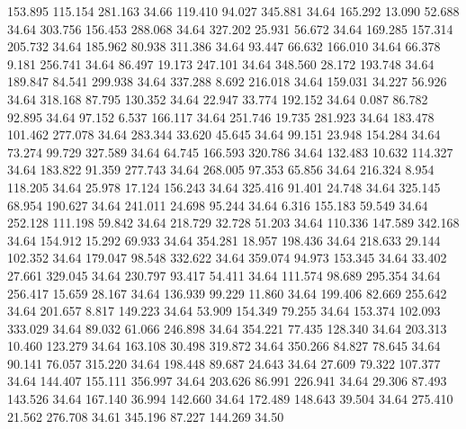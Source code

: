  153.895  115.154  281.163        34.66
 119.410   94.027  345.881        34.64
 165.292   13.090   52.688        34.64
 303.756  156.453  288.068        34.64
 327.202   25.931   56.672        34.64
 169.285  157.314  205.732        34.64
 185.962   80.938  311.386        34.64
  93.447   66.632  166.010        34.64
  66.378    9.181  256.741        34.64
  86.497   19.173  247.101        34.64
 348.560   28.172  193.748        34.64
 189.847   84.541  299.938        34.64
 337.288    8.692  216.018        34.64
 159.031   34.227   56.926        34.64
 318.168   87.795  130.352        34.64
  22.947   33.774  192.152        34.64
   0.087   86.782   92.895        34.64
  97.152    6.537  166.117        34.64
 251.746   19.735  281.923        34.64
 183.478  101.462  277.078        34.64
 283.344   33.620   45.645        34.64
  99.151   23.948  154.284        34.64
  73.274   99.729  327.589        34.64
  64.745  166.593  320.786        34.64
 132.483   10.632  114.327        34.64
 183.822   91.359  277.743        34.64
 268.005   97.353   65.856        34.64
 216.324    8.954  118.205        34.64
  25.978   17.124  156.243        34.64
 325.416   91.401   24.748        34.64
 325.145   68.954  190.627        34.64
 241.011   24.698   95.244        34.64
   6.316  155.183   59.549        34.64
 252.128  111.198   59.842        34.64
 218.729   32.728   51.203        34.64
 110.336  147.589  342.168        34.64
 154.912   15.292   69.933        34.64
 354.281   18.957  198.436        34.64
 218.633   29.144  102.352        34.64
 179.047   98.548  332.622        34.64
 359.074   94.973  153.345        34.64
  33.402   27.661  329.045        34.64
 230.797   93.417   54.411        34.64
 111.574   98.689  295.354        34.64
 256.417   15.659   28.167        34.64
 136.939   99.229   11.860        34.64
 199.406   82.669  255.642        34.64
 201.657    8.817  149.223        34.64
  53.909  154.349   79.255        34.64
 153.374  102.093  333.029        34.64
  89.032   61.066  246.898        34.64
 354.221   77.435  128.340        34.64
 203.313   10.460  123.279        34.64
 163.108   30.498  319.872        34.64
 350.266   84.827   78.645        34.64
  90.141   76.057  315.220        34.64
 198.448   89.687   24.643        34.64
  27.609   79.322  107.377        34.64
 144.407  155.111  356.997        34.64
 203.626   86.991  226.941        34.64
  29.306   87.493  143.526        34.64
 167.140   36.994  142.660        34.64
 172.489  148.643   39.504        34.64
 275.410   21.562  276.708        34.61
 345.196   87.227  144.269        34.50
